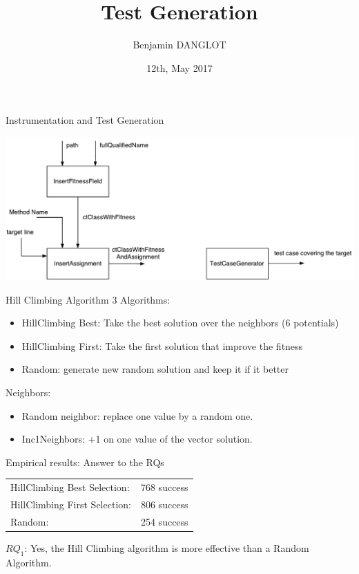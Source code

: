 \documentclass{beamer}
\title[Test Generation]{Test Generation} %
\author{Benjamin DANGLOT} %
\institute[DIBRIS] %
{
\medskip
\textit{} %
}
\date{12th, May 2017} %
\begin{document}
\tracingall


\begin{frame}
\maketitle
\end{frame}

\begin{frame}{Instrumentation and Test Generation}
    \begin{center}
        \includegraphics[scale=0.45]{diagram_1.pdf}
    \end{center}
\end{frame}

\begin{frame}{Hill Climbing Algorithm}
3 Algorithms:
    \begin{itemize}
    \item HillClimbing Best: Take the best solution over the neighbors (6 potentials)
    \item HillClimbing First: Take the first solution that improve the fitness
    \item Random: generate new random solution and keep it if it better
    \end{itemize}
Neighbors:
    \begin{itemize}
    \item Random neighbor: replace one value by a random one.
    \item Inc1Neighbors: +1 on one value of the vector solution.
    \end{itemize}
\end{frame}

\begin{frame}{Empirical results: Answer to the RQs}
\begin{center}
\begin{tabular}{ll}
HillClimbing Best Selection: &768 success\\
HillClimbing First Selection: &806 success\\
Random: &254 success\\
\end{tabular}
\begin{mdframed}
\textbf{$RQ_1$}: Yes, the Hill Climbing algorithm is more effective than a Random Algorithm.
\end{mdframed}
\end{center}
\end{frame}
\end{document}
